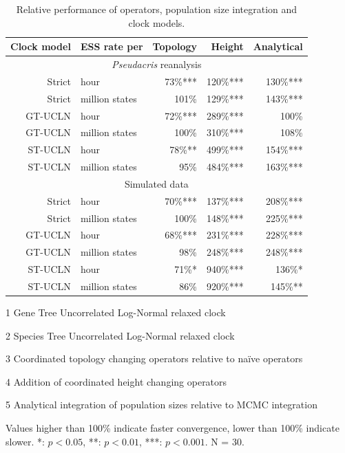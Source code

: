 \documentclass[nogrid]{MBE}%
\begin{document}
\begin{table}[htb!]
\caption{Relative performance of operators, population size integration and clock models.}
\label{tab:convergenceLM}
\begin{threeparttable}
\begin{tabular*}{\textwidth}{@{\extracolsep{\fill}}rlrrr@{}}
\hline
Clock model & ESS rate per & Topology\tnote{3} & Height\tnote{4} & Analytical\tnote{5}\tabularnewline
\hline
\multicolumn{5}{c}{\textit{Pseudacris} reanalysis}\tabularnewline
\hline
Strict & hour & 73\%{***} & 120\%{***} & 130\%{***}\tabularnewline
Strict & million states & 101\%\hphantom{***} & 129\%{***} & 143\%{***}\tabularnewline
GT-UCLN\tnote{1} & hour & 72\%{***} & 289\%{***} & 100\%\hphantom{***}\tabularnewline
GT-UCLN & million states & 100\%\hphantom{***} & 310\%{***} & 108\%\hphantom{***}\tabularnewline
ST-UCLN\tnote{2} & hour & 78\%{**}\hphantom{*} & 499\%{***} & 154\%{***}\tabularnewline
ST-UCLN & million states & 95\%\hphantom{***} & 484\%{***} & 163\%{***}\tabularnewline
\hline
\multicolumn{5}{c}{Simulated data}\tabularnewline
\hline
Strict & hour & 70\%{***} & 137\%{***} & 208\%{***}\tabularnewline
Strict & million states & 100\%\hphantom{***} & 148\%{***} & 225\%{***}\tabularnewline
GT-UCLN & hour & 68\%{***} & 231\%{***} & 228\%{***}\tabularnewline
GT-UCLN & million states & 98\%\hphantom{***} & 248\%{***} & 248\%{***}\tabularnewline
ST-UCLN & hour & 71\%{*}\hphantom{**} & 940\%{***} & 136\%{*}\hphantom{**}\tabularnewline
ST-UCLN & million states & 86\%\hphantom{***} & 920\%{***} & 145\%{**}\hphantom{*}\tabularnewline
\hline
\end{tabular*}
\begin{tablenotes}
\item[1] Gene Tree Uncorrelated Log-Normal relaxed clock
\item[2] Species Tree Uncorrelated Log-Normal relaxed clock
\item[3] Coordinated topology changing operators relative to na\"ive operators
\item[4] Addition of coordinated height changing operators
\item[5] Analytical integration of population sizes relative to MCMC integration
\item Values higher than 100\% indicate faster convergence, lower than 100\% indicate slower. {*}: $p < 0.05$, {**}: $p < 0.01$, {***}: $p < 0.001$. N = 30.
\end{tablenotes}
\end{threeparttable}
\end{table}
\end{document}

